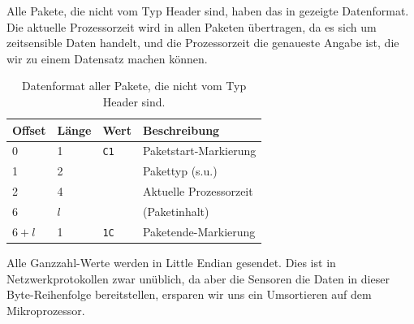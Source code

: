 Alle Pakete, die nicht vom Typ Header sind, haben das in 
gezeigte Datenformat.  Die aktuelle Prozessorzeit wird in allen Paketen
übertragen, da es sich um zeitsensible Daten handelt, und die Prozessorzeit die
genaueste Angabe ist, die wir zu einem Datensatz machen können.

\begin{table}[h]
    \centering
    \begin{tabular}{@{}llll@{}}
        \toprule
        Offset & Länge & Wert & Beschreibung \\ \midrule
        0   & 1 & \texttt{C1} & Paketstart-Markierung \\
        1   & 2 & & Pakettyp (s.u.) \\
        2   & 4 & & Aktuelle Prozessorzeit \\
        6 & $l$ & & (Paketinhalt) \\
        $6 + l$ & 1 & \texttt{1C} & Paketende-Markierung \\
        \bottomrule
    \end{tabular}
    \caption{Datenformat aller Pakete, die nicht vom Typ Header sind.}
\end{table}

Alle Ganzzahl-Werte werden in Little Endian gesendet. Dies ist in
Netz\-werk\-pro\-to\-kol\-len zwar unüblich, da aber die Sensoren die Daten in
dieser Byte-Reihenfolge bereitstellen, ersparen wir uns ein Umsortieren auf dem
Mikroprozessor.


